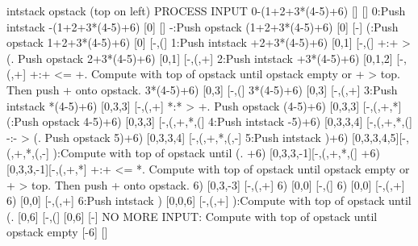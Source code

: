 {\scriptsize
\begin{console}
                  intstack opstack (top on left)
                                           PROCESS INPUT
0-(1+2+3*(4-5)+6) []         []
                                           0:Push intstack
 -(1+2+3*(4-5)+6) [0]        []
                                           -:Push opstack
  (1+2+3*(4-5)+6) [0]        [-]
                                           (:Push opstack
   1+2+3*(4-5)+6) [0]        [-,(]
                                           1:Push intstack
    +2+3*(4-5)+6) [0,1]      [-,(]
                                           +:+ > (. Push opstack
     2+3*(4-5)+6) [0,1]      [-,(,+] 
                                           2:Push intstack
      +3*(4-5)+6) [0,1,2]    [-,(,+] 
                                           +:+ <= +. Compute with top of
                                             opstack until opstack empty or
                                             + > top.
                                             Then push + onto opstack.
       3*(4-5)+6) [0,3]      [-,(]
       3*(4-5)+6) [0,3]      [-,(,+]
                                           3:Push intstack
        *(4-5)+6) [0,3,3]    [-,(,+]
                                           *:* > +. Push opstack
         (4-5)+6) [0,3,3]    [-,(,+,*]
                                           (:Push opstack
          4-5)+6) [0,3,3]    [-,(,+,*,(]
                                           4:Push intstack
           -5)+6) [0,3,3,4]  [-,(,+,*,(]  
                                           -:- > (. Push opstack
            5)+6) [0,3,3,4]  [-,(,+,*,(,-]
                                           5:Push intstack
             )+6) [0,3,3,4,5][-,(,+,*,(,-]
                                           ):Compute with top of opstack
                                             until (.
              +6) [0,3,3,-1][-,(,+,*,(]
              +6) [0,3,3,-1][-,(,+,*]
                                          +:+ <= *. Compute with top of
                                            opstack until opstack empty or
                                            + > top.
                                            Then push + onto opstack.      
               6) [0,3,-3]  [-,(,+]
               6) [0,0]     [-,(]
               6) [0,0]     [-,(,+]
               6) [0,0]     [-,(,+]
                                          6:Push intstack
                ) [0,0,6]   [-,(,+]
                                          ):Compute with top of opstack
                                             until (.
                  [0,6]     [-,(]
                  [0,6]     [-]
                                          NO MORE INPUT: Compute with
                                          top of opstack until opstack
                                          empty
                  [-6]      []
\end{console}
}

